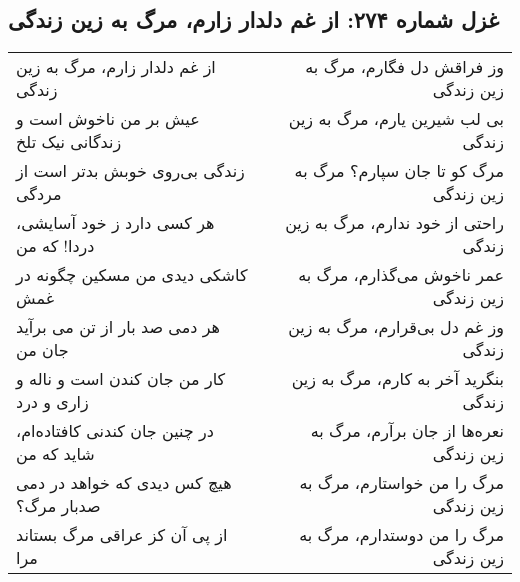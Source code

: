 \begin{center}
\section*{غزل شماره ۲۷۴: از غم دلدار زارم، مرگ به زین زندگی}
\label{sec:274}
\begin{longtable}{l p{0.5cm} r}
از غم دلدار زارم، مرگ به زین زندگی
&&
وز فراقش دل فگارم، مرگ به زین زندگی
\\
عیش بر من ناخوش است و زندگانی نیک تلخ
&&
بی لب شیرین یارم، مرگ به زین زندگی
\\
زندگی بی‌روی خوبش بدتر است از مردگی
&&
مرگ کو تا جان سپارم؟ مرگ به زین زندگی
\\
هر کسی دارد ز خود آسایشی، دردا! که من
&&
راحتی از خود ندارم، مرگ به زین زندگی
\\
کاشکی دیدی من مسکین چگونه در غمش
&&
عمر ناخوش می‌گذارم، مرگ به زین زندگی
\\
هر دمی صد بار از تن می برآید جان من
&&
وز غم دل بی‌قرارم، مرگ به زین زندگی
\\
کار من جان کندن است و ناله و زاری و درد
&&
بنگرید آخر به کارم، مرگ به زین زندگی
\\
در چنین جان کندنی کافتاده‌ام، شاید که من
&&
نعره‌ها از جان برآرم، مرگ به زین زندگی
\\
هیچ کس دیدی که خواهد در دمی صدبار مرگ؟
&&
مرگ را من خواستارم، مرگ به زین زندگی
\\
از پی آن کز عراقی مرگ بستاند مرا
&&
مرگ را من دوستدارم، مرگ به زین زندگی
\\
\end{longtable}
\end{center}
